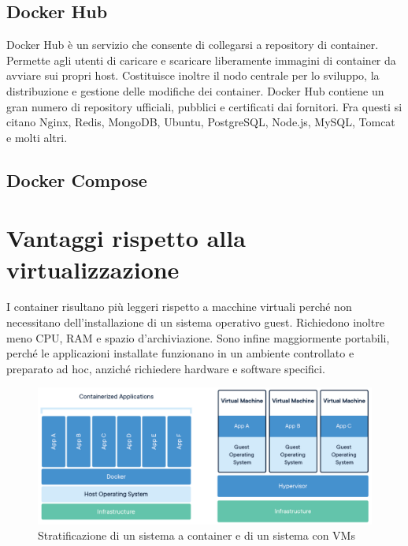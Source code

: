 \subsection{Docker Hub}
Docker Hub è un servizio che consente di collegarsi a repository di container. Permette agli utenti di caricare e scaricare liberamente immagini di container da avviare sui propri host. Costituisce inoltre il nodo centrale per lo sviluppo, la distribuzione e gestione delle modifiche dei container. Docker Hub contiene un gran numero di repository ufficiali, pubblici e certificati dai fornitori. Fra questi si citano Nginx, Redis, MongoDB, Ubuntu, PostgreSQL, Node.js, MySQL, Tomcat e molti altri.

\subsection{Docker Compose}



\subsection{}
 
\section{Vantaggi rispetto alla virtualizzazione}
I container risultano più leggeri rispetto a macchine virtuali perché non necessitano dell'installazione di un sistema operativo guest. Richiedono inoltre meno CPU, RAM e spazio d'archiviazione. Sono infine maggiormente portabili, perché le applicazioni installate funzionano in un ambiente controllato e preparato ad hoc, anziché richiedere hardware e software specifici.
\begin{figure}[ht]
    \centering
    \includegraphics[width=\textwidth]{immagini/docker-containerized-and-vm-transparent-bg.png}
    \caption{Stratificazione di un sistema a container e di un sistema con VMs}
    \label{fig:my_label}
\end{figure}